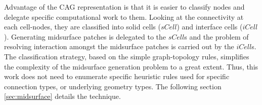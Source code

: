 Advantage of the CAG representation is that it is easier to classify nodes and delegate specific computational work to them.  Looking at the connectivity at each cell-nodes, they are classified into solid cells ($sCell$) and interface cells ($iCell$).  Generating midsurface patches is delegated to the $sCell$s  and the problem of resolving interaction amongst the midsurface patches is carried out by the $iCell$s. The classification strategy,  based on the simple graph-topology rules, simplifies the complexity of the midsurface generation problem to a great extent.  Thus, this work does not need to enumerate specific heuristic rules used for specific connection types, or underlying geometry types.  The following section \ref{sec:midsurface} details the technique. %



%
%


